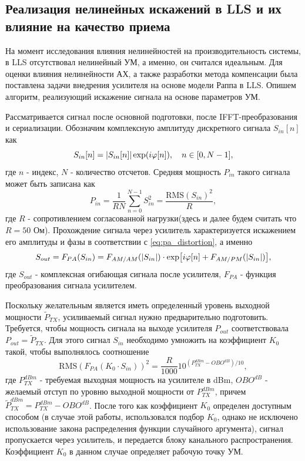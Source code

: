 



\subsection{Реализация нелинейных искажений в LLS и их влияние на качество приема}

На момент исследования влияния нелинейностей на производительность системы,
в LLS отсутствовал нелинейный УМ, а именно, он считался идеальным. Для
оценки влияния нелинейности АХ, а также разработки метода компенсации была
поставлена задачи внедрения усилителя на основе модели Раппа в LLS.
Опишем алгоритм, реализующий искажение сигнала на основе параметров УМ.

Рассматривается сигнал после основной подготовки, после IFFT-преобразования
и сериализации. Обозначим комплексную амплитуду дискретного сигнала
$S_{in}[n]$ как
\begin{equation}
    S_{in}[n] = \abs{S_{in}[n]}\exp(i\varphi[n]),\quad n \in[0, N-1],
\end{equation}
где $n$ - индекс, $N$ - количество отсчетов. Средняя мощность
$P_{in}$ такого сигнала может быть записана как 
\begin{equation}
    P_{in} = \frac{1}{RN}\sum_{n=0}^{N-1}S^2_{in} = \frac{\text{RMS}(S_{in})^2}{R},
\end{equation}
где $R$ - сопротивлением согласованной нагрузки(здесь и далее будем считать
что $R=50$ Ом). Прохождение сигнала через усилитель характеризуется
искажением его амплитуды и фазы в соответствии с \ref{eq:pa_distortion}, а
именно
\begin{equation}
    S_{out} = F_{PA}(S_{in}) = F_{AM/AM}(\abs{S_{in}}) \cdot \exp[i \varphi[n] + F_{AM/PM}(\abs{S_{in}})],
\end{equation}
где $S_{out}$ - комплексная огибающая сигнала после усилителя, $F_{PA}$ -
функция преобразования сигнала усилителем.

Поскольку желательным является иметь определенный уровень
выходной мощности $\tilde{P}_{TX}$, усиливаемый сигнал нужно
предварительно подготовить. Требуется, чтобы мощность сигнала на выходе
усилителя $P_{out}$ соответствовала $P_{out} = \tilde{P}_{TX}$.
Для этого сигнал $S_{in}$ необходимо умножить на коэффициент $K_0$ такой,
чтобы выполнялось соотношение
\begin{equation}
    \displaystyle
    \text{RMS}(F_{PA}(K_0 \cdot S_{in}))^2 = \frac{R}{1000} 10^{\left(P^{dBm}_{TX} - OBO^{dB}\right)/10},
\end{equation}
где $P^{dBm}_{TX}$ - требуемая выходная мощность на усилителе в dBm,
$OBO^{dB}$ - желаемый отступ по уровню выходной мощности от $P^{dBm}_{TX}$,
причем $\tilde{P}^{dBm}_{TX} = P^{dBm}_{TX} - OBO^{dB}$.
После того как коэффициент $K_0$ определен доступным способом (в случае
этой работы, использовался подбор $K_0$, однако не исключено использование
закона распределения функции случайного аргумента), сигнал пропускается
через усилитель, и передается блоку канального распространения. Коэффициент
$K_0$ в данном случае определяет рабочую точку УМ.

